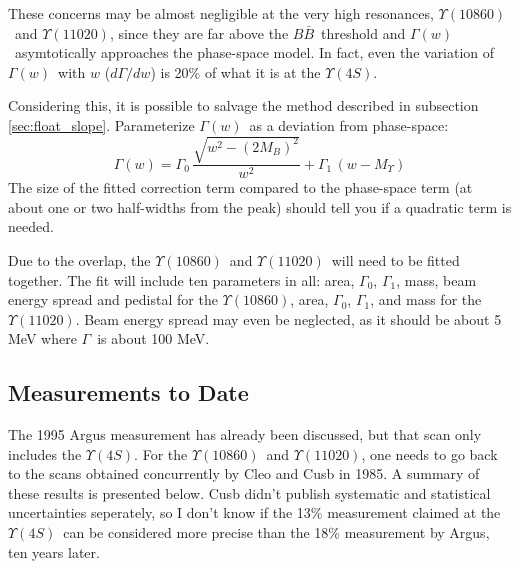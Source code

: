 \documentclass[12pt]{article}
\def\yivs{$\Upsilon(4S)$}
\def\yvs{$\Upsilon(10860)$}
\def\yvis{$\Upsilon(11020)$}
\def\gamtot{$\Gamma$}
\def\gamofw{$\Gamma(w)$}
\def\bbar{$B\bar{B}$}
\begin{document}
These concerns may be almost negligible at the very high resonances,
\yvs\ and \yvis, since they are far above the \bbar\ threshold and
\gamofw\ asymtotically approaches the phase-space model. In fact, even
the variation of \gamofw\ with $w$ ($d\Gamma/dw$) is 20\% of what it
is at the \yivs.

\label{page:freedom}
Considering this, it is possible to salvage the method described in
subsection \ref{sec:float_slope}. Parameterize \gamofw\ as a deviation
from phase-space:
\begin{equation}
  \Gamma(w) = \Gamma_0 \, \frac{\sqrt{w^2 - (2 M_B)^2}}{w^2} + \Gamma_1 \, (w - \mbox{$M_\Upsilon$})
\end{equation}
The size of the fitted correction term compared to the phase-space
term (at about one or two half-widths from the peak) should tell you
if a quadratic term is needed.


Due to the overlap, the \yvs\ and \yvis\ will need to be fitted
together. The fit will include ten parameters in all: area,
$\Gamma_0$, $\Gamma_1$, mass, beam energy spread and pedistal for the
\yvs, area, $\Gamma_0$, $\Gamma_1$, and mass for the \yvis. Beam
energy spread may even be neglected, as it should be about 5 MeV where
\gamtot\ is about 100 MeV.

\subsection{Measurements to Date}

The 1995 {\sc Argus} measurement has already been discussed, but that
scan only includes the \yivs. For the \yvs\ and \yvis, one needs to go
back to the scans obtained concurrently by {\sc Cleo} and {\sc Cusb}
in 1985. A summary of these results is presented below. {\sc Cusb}
didn't publish systematic and statistical uncertainties seperately, so
I don't know if the 13\% measurement claimed at the \yivs\ can be
considered more precise than the 18\% measurement by {\sc Argus}, ten
years later.
\end{document}

